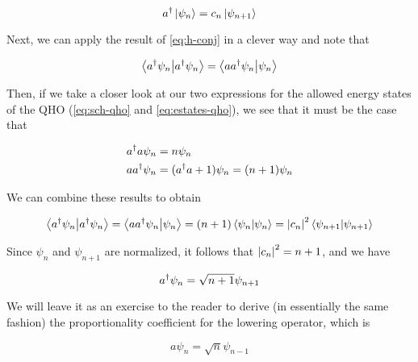 \begin{equation*}
	a^{\dagger} \ket{\psi_n} = c_n \ket{\psi_{n+1}}
\end{equation*}

Next, we can apply the result of \autoref{eq:h-conj} in a clever way and note that

\begin{equation*}
	\braket{a^{\dagger} \psi_n}{a^{\dagger} \psi_n} = \braket{aa^{\dagger} \psi_n}{\psi_n}
\end{equation*}

Then, if we take a closer look at our two expressions for the allowed energy states of the QHO (\autoref{eq:sch-qho} and \ref{eq:estates-qho}), we see that it must be the case that 

\begin{align}
	a^{\dagger} a \psi_n &= n\psi_n \label{eq:ada-prop} \\
	a a^{\dagger} \psi_n &= (a^{\dagger} a + 1)\psi_n = (n+1)\psi_n \label{eq:aad-prop}
\end{align} 

We can combine these results to obtain

\begin{equation*}
	\braket{a^{\dagger} \psi_n}{a^{\dagger} \psi_n} = \braket{aa^{\dagger} \psi_n}{\psi_n} = (n+1) \braket{\psi_n}{\psi_n} = \abs{c_n}^2\braket{\psi_{n+1}}{\psi_{n+1}}
\end{equation*}

Since $\psi_n$ and $\psi_{n+1}$ are normalized, it follows that $\abs{c_n}^2 = n+1$, and we have

\begin{tcolorbox}[title = Raising operator proportionality constant] \vspace{-2ex}
	\begin{equation}
		a^{\dagger} \psi_n = \sqrt{n+1} \psi_{n+1} \label{eq:ad-prop}
	\end{equation}
\end{tcolorbox}

We will leave it as an exercise to the reader to derive (in essentially the same fashion) the proportionality coefficient for the lowering operator, which is 

\begin{equation}
	a \psi_n = \sqrt{n} \psi_{n-1} \label{eq:a-prop}
\end{equation}


